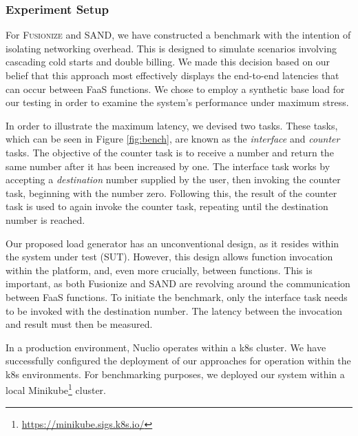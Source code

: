 \subsubsection{Experiment Setup}
\label{subsubsec:evaluation:fusionize_and_sand:experiment_setup}

For \textsc{Fusionize} and SAND, we have constructed a benchmark with the
intention of isolating networking overhead. This is designed to simulate scenarios
involving cascading cold starts and double billing. We made this decision based
on our belief that this approach most effectively displays the end-to-end
latencies that can occur between FaaS functions. We chose to employ a synthetic
base load for our testing in order to examine the system's performance under
maximum stress.

In order to illustrate the maximum latency, we devised two tasks. These tasks,
which can be seen in Figure \ref{fig:bench}, are known as the \emph{interface}
and \emph{counter} tasks. The objective of the counter task is to receive a
number and return the same number after it has been increased by one. The
interface task works by accepting a \emph{destination} number supplied by the
user, then invoking the counter task, beginning with the number zero. Following
this, the result of the counter task is used to again invoke the counter task,
repeating until the destination number is reached.

Our proposed load generator has an unconventional design, as it resides within
the system under test (SUT). However, this design allows function invocation
within the platform, and, even more crucially, between functions. This is
important, as both Fusionize and SAND are revolving around the communication
between FaaS functions. To initiate the benchmark, only the interface task needs
to be invoked with the destination number. The latency between the invocation
and result must then be measured.


In a production environment, Nuclio operates within a k8s cluster. We have
successfully configured the deployment of our approaches for operation within
the k8s environments. For benchmarking purposes, we deployed our system within a
local Minikube\footnote{\url{https://minikube.sigs.k8s.io/}} cluster.

